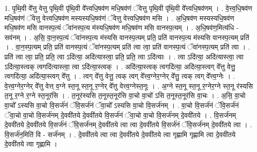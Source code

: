 \documentclass[17pt]{extarticle}
\begin{document}
1. पृ॒थि॒वी वे᳚त्तु वेत्तु पृथि॒वी पृ॑थि॒वी वे᳚त्त्वधि॒षव॑ण मधि॒षव॑णं ॅवेत्तु पृथि॒वी पृ॑थि॒वी वे᳚त्त्वधि॒षव॑णम् । . वे॒त्त्व॒धि॒षव॑ण मधि॒षव॑णं ॅवेत्तु वेत्त्वधि॒षव॑ण मस्यस्यधि॒षव॑णं ॅवेत्तु वेत्त्वधि॒षव॑ण मसि । . अ॒धि॒षव॑ण मस्यस्यधि॒षव॑ण मधि॒षव॑ण मसि वानस्प॒त्यं ॅवा॑नस्प॒त्य 
म॑स्यधि॒षव॑ण मधि॒षव॑ण मसि वानस्प॒त्यम् । . अ॒धि॒षव॑ण॒मित्य॑धि - सव॑नम् । . अ॒सि॒ वा॒न॒स्प॒त्यं ॅवा॑नस्प॒त्य म॑स्यसि वानस्प॒त्यम् प्रति॒ प्रति॑ वानस्प॒त्य म॑स्यसि वानस्प॒त्यम् प्रति॑ । . वा॒न॒स्प॒त्यम् प्रति॒ प्रति॑ वानस्प॒त्यं ॅवा॑नस्प॒त्यम् प्रति॑ त्वा त्वा॒ प्रति॑ वानस्प॒त्यं ॅवा॑नस्प॒त्यम् प्रति॑ त्वा । . प्रति॑ त्वा त्वा॒ प्रति॒ प्रति॒ त्वा ऽदि॑त्या॒ अदि॑त्यास्त्वा॒ प्रति॒ प्रति॒ त्वा ऽदि॑त्याः । . त्वा ऽदि॑त्या॒ अदि॑त्यास्त्वा॒ त्वा ऽदि॑त्या॒स्त्वक् त्वगदि॑त्यास्त्वा॒ त्वा ऽदि॑त्या॒स्त्वक् । . अदि॑त्या॒स्त्वक् त्वगदि॑त्या॒ अदि॑त्या॒स्त्वग् वे᳚त्तु वेत्तु॒ त्वगदि॑त्या॒ अदि॑त्या॒स्त्वग् वे᳚त्तु । . त्वग् वे᳚त्तु वेत्तु॒ त्वक् त्वग् वे᳚त्त्व॒ग्नेर॒ग्नेर् वे᳚त्तु॒ त्वक् त्वग् वे᳚त्त्व॒ग्नेः । . वे॒त्त्व॒ग्नेर॒ग्नेर् वे᳚त्तु वेत्त् व॒ग्ने स्त॒नू स्त॒नू र॒ग्नेर् वे᳚त्तु वेत्त्व॒ग्नेस्त॒नूः । . अ॒ग्ने स्त॒नू स्त॒नू र॒ग्नेर॒ग्ने स्त॒नू र॑स्यसि त॒नू र॒ग्ने र॒ग्ने स्त॒नूर॑सि । . त॒नूर॑स्यसि त॒नूस्त॒नूर॑सि वा॒चो वा॒चो॑ ऽसि त॒नूस्त॒नूर॑सि वा॒चः । . अ॒सि॒ वा॒चो वा॒चो᳚ ऽस्यसि वा॒चो वि॒सर्ज॑नं ॅवि॒सर्ज॑नं ॅवा॒चो᳚ ऽस्यसि वा॒चो वि॒सर्ज॑नम् । . वा॒चो वि॒सर्ज॑नं ॅवि॒सर्ज॑नं ॅवा॒चो वा॒चो वि॒सर्ज॑नम् दे॒ववी॑तये दे॒ववी॑तये वि॒सर्ज॑नं ॅवा॒चो वा॒चो वि॒सर्ज॑नम् दे॒ववी॑तये । . वि॒सर्ज॑नम् दे॒ववी॑तये दे॒ववी॑तये वि॒सर्ज॑नं ॅवि॒सर्ज॑नम् दे॒ववी॑तये त्वा त्वा दे॒ववी॑तये वि॒सर्ज॑नं ॅवि॒सर्ज॑नम् दे॒ववी॑तये त्वा । . वि॒सर्ज॑न॒मिति॑ वि - सर्ज॑नम् । . दे॒ववी॑तये त्वा त्वा दे॒ववी॑तये दे॒ववी॑तये त्वा गृह्णामि गृह्णामि त्वा दे॒ववी॑तये दे॒ववी॑तये त्वा गृह्णामि । \newline
\end{document}
